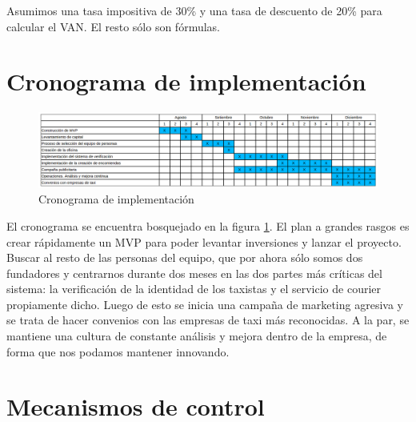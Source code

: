 Asumimos una tasa impositiva de 30\% y una tasa de descuento de 20\% para calcular el VAN. El resto sólo son fórmulas.

\section{Cronograma de implementación}

\begin{figure}[htb]
\centering
\includegraphics[width=1\textwidth]{./img/cronograma}
\caption{Cronograma de implementación} \label{fig:cronograma}
\end{figure}

El cronograma se encuentra bosquejado en la figura \ref{fig:cronograma}. El plan a grandes rasgos es crear rápidamente un MVP para poder levantar inversiones y lanzar el proyecto. Buscar al resto de las personas del equipo, que por ahora sólo somos dos fundadores y centrarnos durante dos meses en las dos partes más críticas del sistema: la verificación de la identidad de los taxistas y el servicio de courier propiamente dicho. Luego de esto se inicia una campaña de marketing agresiva y se trata de hacer convenios con las empresas de taxi más reconocidas. A la par, se mantiene una cultura de constante análisis y mejora dentro de la empresa, de forma que nos podamos mantener innovando.


\section{Mecanismos de control}